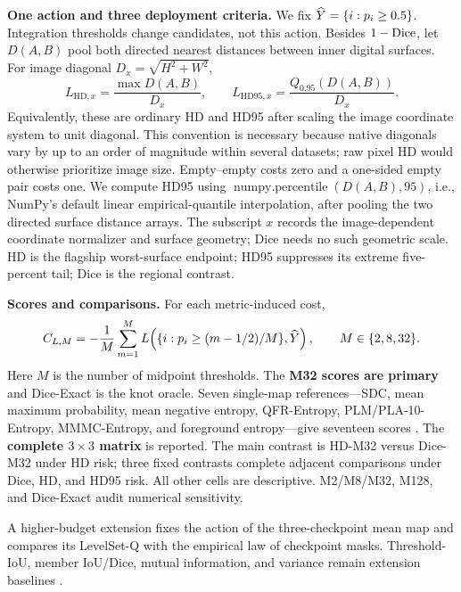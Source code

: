 \noindent\textbf{One action and three deployment criteria.}
We fix \(\widehat{Y}=\{i:p_i\geq0.5\}\). Integration thresholds change candidates,
not this action. Besides \(1-\operatorname{Dice}\), let \(D(A,B)\) pool both directed nearest
distances between inner digital surfaces. For image diagonal
\(D_x=\sqrt{H^2+W^2}\),
\begin{equation*}
  L_{\mathrm{HD},x}=\frac{\max D(A,B)}{D_x},\qquad
  L_{\mathrm{HD95},x}=\frac{Q_{0.95}(D(A,B))}{D_x}.
\end{equation*}
Equivalently, these are ordinary HD and HD95 after scaling the image coordinate
system to unit diagonal. This convention is necessary because native diagonals
vary by up to an order of magnitude within several datasets; raw pixel HD would
otherwise prioritize image size. Empty--empty costs zero and a one-sided empty
pair costs one. We compute HD95 using
\(\operatorname{numpy.percentile}(D(A,B),95)\), i.e., NumPy's default linear
empirical-quantile interpolation, after pooling the two directed surface
distance arrays. The subscript \(x\) records the image-dependent coordinate
normalizer and surface geometry; Dice needs no such geometric scale. HD is the
flagship worst-surface endpoint; HD95 suppresses its extreme five-percent tail;
Dice is the regional contrast.

\noindent\textbf{Scores and comparisons.}
For each metric-induced cost,
\begin{equation*}
  C_{L,M}=-\frac1M\sum_{m=1}^M
  L\!\left(\{i:p_i\geq(m-1/2)/M\},\widehat{Y}\right),
  \qquad M\in\{2,8,32\}.
\end{equation*}
Here \(M\) is the number of midpoint thresholds. The \textbf{M32 scores are
primary} and Dice-Exact is the knot oracle. Seven single-map
references---SDC, mean maximum probability, mean negative entropy, QFR-Entropy,
PLM/PLA-10-Entropy, MMMC-Entropy, and foreground entropy---give seventeen scores
\citep{sdc,guarino2026aggregation,holder2021uncertainty}. The
\textbf{complete \(3\times3\) matrix} is reported. The main contrast is HD-M32 versus Dice-M32
under HD risk; three fixed contrasts complete adjacent comparisons under Dice,
HD, and HD95 risk. All other cells are descriptive. M2/M8/M32, M128, and
Dice-Exact audit numerical sensitivity.

A higher-budget extension fixes the action of the three-checkpoint mean map and
compares its LevelSet-Q with the empirical law of checkpoint masks. Threshold-IoU,
member IoU/Dice, mutual information, and variance remain extension baselines
\citep{roy2019bayesianquicknat,kirillov2023segmentanything}.


